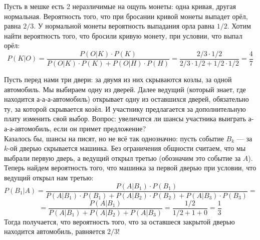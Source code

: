 \documentclass[11pt]{article}
\begin{document}
\begin{example}
    Пусть в мешке есть 2 неразличимые на ощупь монеты: одна кривая, другая нормальная. Вероятность того, что при бросании кривой монеты выпадет
    орёл, равна $2/3$. У нормальной монеты вероятность выпадания орла равна $1/2$. Хотим найти вероятность того, что бросили кривую монету, 
    при условии, что выпал орёл: \[P(K | O) = \frac{P(O | K) \cdot P(K)}{P(O | K) \cdot P(K) + P(O | H) \cdot P(H)} = 
    \frac{2 / 3 \cdot 1 / 2}{2/3 \cdot 1/2 + 1/2 \cdot 1/2} = \frac{4}{7}\]
\end{example}

\begin{example}
    Пусть перед нами три двери: за двумя из них скрываются козлы, за одной автомобиль. Мы выбираем одну из дверей. Далее ведущий (который знает, 
    где находится а-а-а-автомобиль) открывает одну из оставшихся дверей, обязательно ту, за которой скрывается козёл. И участнику предлагается
    за дополнительную плату изменить свой выбор. Вопрос: увеличатся ли шансы участника выиграть а-а-а-автомобиль, если он примет предложение?
    \\
    Казалось бы, шансы  на писят\textquotedbl, но не всё так однозначно: пусть событие $B_k$ --- за $k$-ой дверью скрывается машинка. Без ограничения
    общности считаем, что мы выбрали первую дверь, а ведущий открыл третью (обозначим это событие за $A$). Теперь найдем вероятность того, что 
    машинка за первой дверью при условии, что ведущий открыл нам третью: \[P(B_1 | A) = \frac{P(A | B_1) \cdot P(B_1)}{P(A | B_1) \cdot P(B_1) + 
    P(A | B_2) \cdot P(B_2) + P(A | B_3) \cdot P(B_3)} = \] 
    \[ = \frac{P(A | B_1)}{P(A | B_1) + P(A | B_2) + P(A | B_3)} = \frac{1 / 2}{1/2 + 1 + 0} = \frac{1}{3}\]
    Тогда получается, что вероятность того, что за оставшеся закрытой дверью находится автомобиль, равняется $2/3$!
\end{example}
\end{document}
